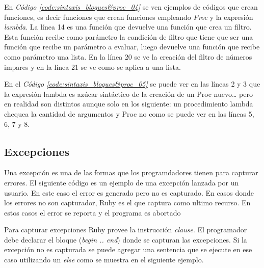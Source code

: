 \documentclass{article}
\newcommand{\refcode}[1]{\textit{Código \ref{#1}}}
\begin{document}
En \refcode{code:sintaxis_bloques&proc_04} se ven ejemplos de códigos que crean funciones, es decir funciones que crean funciones empleando \textit{Proc} y la expresión \textit{lambda}. La línea 14 es una función que devuelve una función que crea un filtro. Esta función recibe como parámetro la condición de filtro que tiene que ser una función que recibe un parámetro a evaluar, luego devuelve una función que recibe como parámetro una lista. En la línea 20 se ve la creación del filtro de números impares y en la línea 21 se ve como se aplica a una lista.
 
En el \refcode{code:sintaxis_bloques&proc_05} se puede ver en las líneas 2 y 3 que la expresión lambda es azúcar sintáctico de la creación de un Proc nuevo… pero en realidad son distintos aunque solo en los siguiente: un procedimiento lambda chequea la cantidad de argumentos y Proc no como se puede ver en las líneas 5, 6, 7 y 8.
 
\bigskip



\subsection{Excepciones}

Una excepción es una de las formas que los programdadores tienen para capturar errores. 
El siguiente código es un ejemplo de una excepción lanzada por un usuario. En este caso el error es generado pero no es capturado. En casos donde los errores no son capturador, Ruby es el que captura como ultimo recurso. En estos casos el error se reporta y el programa es abortado

 
\bigskip\bigskip

Para capturar excepciones Ruby provee la instrucción \textit{clause}. El programador debe declarar el bloque (\textit{begin .. end}) donde se capturan las excepciones. Si la excepción no es capturada se puede agregar una sentencia que se ejecute en ese caso utilizando un \textit{else} como se muestra en el siguiente ejemplo. 

 
\bigskip\bigskip
\end{document}
